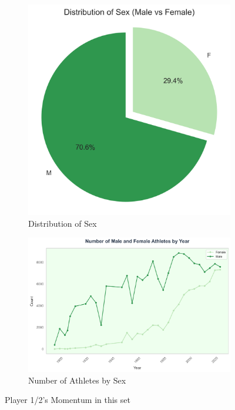 \documentclass{mcmthesis}
\begin{document}
\begin{figure}[htbp]
    \centering
    \begin{subfigure}{0.45\textwidth}
        \centering
        \includegraphics[width=\textwidth]{graph/Distribution of Sex.png}
        \caption{Distribution of Sex}
        \label{subfig:player1}
    \end{subfigure}
    \hfill
    \begin{subfigure}{0.45\textwidth}
        \centering
        \includegraphics[width=\textwidth]{graph/Number_of_Athletes_by_Sex.png}
        \caption{Number of Athletes by Sex}
        \label{subfig:player2}
    \end{subfigure}
    \caption{Player 1/2's Momentum in this set}
    \label{Figure6-7}
\end{figure}
\end{document}
